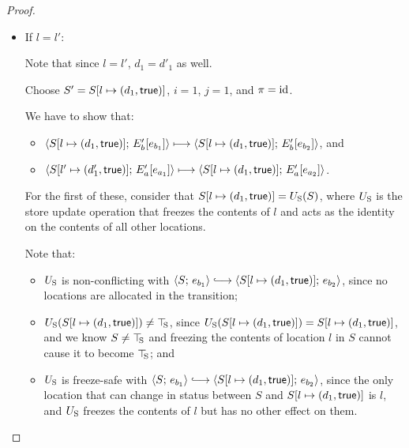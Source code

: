 \begin{proof}
\begin{enumerate}
\begin{enumerate}
\begin{itemize}
      \item If $l = l'$:


        Note that since $l = l'$, $d_1 = d'_1$ as well.

        Choose $S' = S[l \mapsto (d_1, \textsf{true})]$, $i = 1$, $j =
        1$, and $\pi = \mathrm{id}$.

        We have to show that:
        \begin{itemize}
        \item
          $\langle S[l \mapsto (d_1, \textsf{true})];\, E'_b\hspace{-0.5mm}\left[e_{b_1}\right] \rangle
          \longmapsto
          \langle S[l \mapsto (d_1, \textsf{true})];\, E'_b\hspace{-0.5mm}\left[e_{b_2}\right] \rangle$,
          and
        \item
          $\langle S[l' \mapsto (d'_1, \textsf{true})];\, E'_a\hspace{-0.5mm}\left[e_{a_1}\right] \rangle
          \longmapsto
          \langle S[l \mapsto (d_1, \textsf{true})];\, E'_a\hspace{-0.5mm}\left[e_{a_2}\right] \rangle$.
        \end{itemize}

        For the first of these, consider that
        $S[l \mapsto (d_1, \textsf{true})] = U_{\mathrm{S}}(S)$, where $U_{\mathrm{S}}$ is the
        store update operation that freezes the contents of $l$ and
        acts as the identity on the contents of all other locations.

        Note that:
        \begin{itemize}
        \item $U_{\mathrm{S}}$ is non-conflicting with $\config{S}{e_{b_1}}
          \parstepsto
          \config{\extS{S}{l}{d_1}{\frozentrue}}{e_{b_2}}$, since no
          locations are allocated in the transition;
        \item $U_{\mathrm{S}}(S[l \mapsto (d_1, \textsf{true})]) \neq \top\hspace{-0.85mm}_{\mathrm{S}}$, since
          $U_{\mathrm{S}}(S[l \mapsto (d_1, \textsf{true})]) =
          S[l \mapsto (d_1, \textsf{true})]$, and we know $S \neq \top\hspace{-0.85mm}_{\mathrm{S}}$
          and freezing the contents of location $l$ in $S$ cannot
          cause it to become $\top\hspace{-0.85mm}_{\mathrm{S}}$; and
        \item $U_{\mathrm{S}}$ is freeze-safe with $\config{S}{e_{b_1}}
          \parstepsto
          \config{\extS{S}{l}{d_1}{\frozentrue}}{e_{b_2}}$, since
          the only location that can change in status between $S$
          and $S[l \mapsto (d_1, \textsf{true})]$ is $l$, and $U_{\mathrm{S}}$
          freezes the contents of $l$ but has no other effect on
          them.
        \end{itemize}


\end{itemize}
\end{enumerate}
\end{enumerate}
\end{proof}
